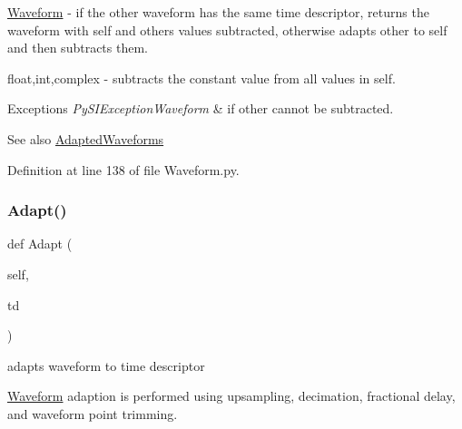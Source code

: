 \begin{DoxyItemize}
\item \hyperlink{classSignalIntegrity_1_1TimeDomain_1_1Waveform_1_1Waveform_1_1Waveform}{Waveform} -\/ if the other waveform has the same time descriptor, returns the waveform with self and others values subtracted, otherwise adapts other to self and then subtracts them.
\item float,int,complex -\/ subtracts the constant value from all values in self. 
\begin{DoxyExceptions}{Exceptions}
{\em Py\+S\+I\+Exception\+Waveform} & if other cannot be subtracted. \\
\hline
\end{DoxyExceptions}
\begin{DoxySeeAlso}{See also}
\hyperlink{namespaceSignalIntegrity_1_1TimeDomain_1_1Waveform_1_1AdaptedWaveforms}{Adapted\+Waveforms} 
\end{DoxySeeAlso}

\end{DoxyItemize}

Definition at line 138 of file Waveform.\+py.

\mbox{\label{classSignalIntegrity_1_1TimeDomain_1_1Waveform_1_1Waveform_1_1Waveform_af3655348c2535f82d246df872f0969e6}} 
\subsubsection{\texorpdfstring{Adapt()}{Adapt()}}
{\footnotesize\ttfamily def Adapt (\begin{DoxyParamCaption}\item[{}]{self,  }\item[{}]{td }\end{DoxyParamCaption})}



adapts waveform to time descriptor 

\hyperlink{classSignalIntegrity_1_1TimeDomain_1_1Waveform_1_1Waveform_1_1Waveform}{Waveform} adaption is performed using upsampling, decimation, fractional delay, and waveform point trimming.



